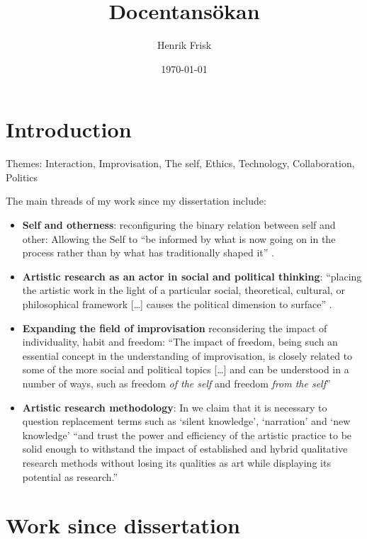 \documentclass[a4paper]{article}
\title{Docentansökan}
\author{Henrik Frisk}
\date{\today}
\begin{document}
\maketitle

\thispagestyle{empty}

\section{Introduction}

Themes: Interaction, Improvisation, The self, Ethics, Technology, Collaboration, Politics

The main threads of my work since my dissertation include:

\begin{itemize}
\item \textbf{Self and otherness}: reconfiguring the binary relation between self and other: Allowing the Self to ``be informed by what is now going on in the process rather than by what has traditionally shaped it'' \citep{frisk2013}.
\item \textbf{Artistic research as an actor in social and political thinking}:  ``placing the artistic work in the light of a particular social, theoretical, cultural, or philosophical framework [\ldots] causes the political dimension to surface'' \cite{frisk-ost13}.
\item \textbf{Expanding the field of improvisation} reconsidering the impact of individuality, habit and freedom: ``The impact of freedom, being such an essential concept in the understanding of improvisation, is closely related to some of the more social and political topics [\ldots] and can be understood in a number of ways, such as freedom \emph{of the self} and freedom \emph{from the self}'' \cite{frisk12-improv}
\item \textbf{Artistic research methodology}: In \cite{frisk-ost13} we claim that it is necessary to question replacement terms such as `silent knowledge', `narration' and `new knowledge' ``and trust the power and efficiency of the artistic practice to be solid enough to withstand the impact of established and hybrid qualitative research methods without losing its qualities as art while displaying its potential as research.''
\end{itemize}

\section{Work since dissertation}
\end{document}
